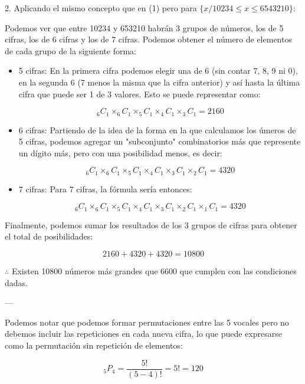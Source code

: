 \documentclass{article}
\begin{document}
\bigskip

2. Aplicando el mismo concepto que en (1) pero para $\{x / 10234 \leq x \leq 6543210 \}$:

Podemos ver que entre 10234 y 653210 habrán 3 grupos de números, los de 5 cifras, los de 6 cifras y los de 7 cifras. Podemos obtener el número de elementos de cada grupo de la siguiente forma:

\begin{itemize}
    \item 5 cifras: En la primera cifra podemos elegir una de 6 (sin contar 7, 8, 9 ni 0), en la segunda 6 (7 menos la misma que la cifra anterior) y así hasta la última cifra que puede ser 1 de 3 valores. Esto se puede representar como:

        $$_6C_1 \times _6C_1 \times _5C_1 \times _4C_1 \times _3C_1 = 2160$$

    \item 6 cifras: Partiendo de la idea de la forma en la que calculamos los úmeros de 5 cifras, podemos agregar un "subconjunto" combinatorios más que represente un dígito más, pero con una posibilidad menos, es decir:

        $$_6C_1 \times _6C_1 \times _5C_1 \times _4C_1 \times _3C_1 \times _2C_1= 4320$$

    \item 7 cifras: Para 7 cifras, la fórmula sería entonces:

        $$_6C_1 \times _6C_1 \times _5C_1 \times _4C_1 \times _3C_1 \times _2C_1 \times _1C_1= 4320$$
\end{itemize}

Finalmente, podemos sumar los resultados de los 3 grupos de cifras para obtener el total de posibilidades:

$$2160 + 4320 + 4320 = 10800$$

$\therefore$ Existen 10800 números más grandes que 6600 que cumplen con las condiciones dadas.

---


Podemos notar que podemos formar permutaciones entre las 5 vocales pero no debemos incluir las repeticiones en cada nueva cifra, lo que puede expresarse como la permutación sin repetición de elementos:

$$_5P_4 = \dfrac{5!}{(5-4)!} = 5! = 120$$
\end{document}
